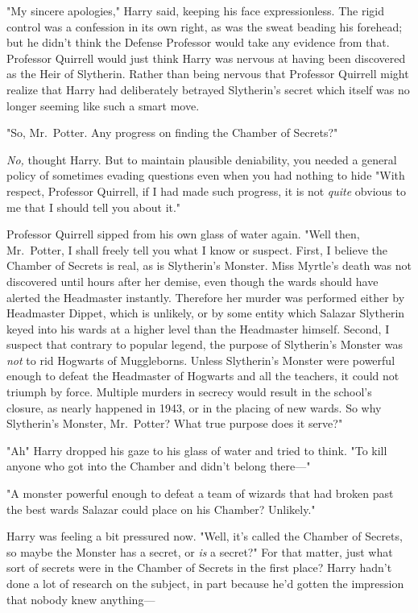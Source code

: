 "My sincere apologies," Harry said, keeping his face expressionless. The rigid
control was a confession in its own right, as was the sweat beading his
forehead; but he didn't think the Defense Professor would take any evidence
from that. Professor Quirrell would just think Harry was nervous at having been
discovered as the Heir of Slytherin. Rather than being nervous that Professor
Quirrell might realize that Harry had deliberately betrayed Slytherin's
secret{\el} which itself was no longer seeming like such a smart move.

"So, Mr.~Potter. Any progress on finding the Chamber of Secrets?"

\emph{No,} thought Harry. But to maintain plausible deniability, you needed a
general policy of sometimes evading questions even when you had nothing to
hide{\el} "With respect, Professor Quirrell, if I had made such progress, it
is not \emph{quite} obvious to me that I should tell you about it."

Professor Quirrell sipped from his own glass of water again. "Well then,
Mr.~Potter, I shall freely tell you what I know or suspect. First, I believe
the Chamber of Secrets is real, as is Slytherin's Monster. Miss Myrtle's death
was not discovered until hours after her demise, even though the wards should
have alerted the Headmaster instantly. Therefore her murder was performed
either by Headmaster Dippet, which is unlikely, or by some entity which Salazar
Slytherin keyed into his wards at a higher level than the Headmaster himself.
Second, I suspect that contrary to popular legend, the purpose of Slytherin's
Monster was \emph{not} to rid Hogwarts of Muggleborns. Unless Slytherin's
Monster were powerful enough to defeat the Headmaster of Hogwarts and all the
teachers, it could not triumph by force. Multiple murders in secrecy would
result in the school's closure, as nearly happened in 1943, or in the placing
of new wards. So why Slytherin's Monster, Mr.~Potter? What true purpose does it
serve?"

"Ah{\el}" Harry dropped his gaze to his glass of water and tried to think. "To
kill anyone who got into the Chamber and didn't belong there—"

"A monster powerful enough to defeat a team of wizards that had broken past the
best wards Salazar could place on his Chamber? Unlikely."

Harry was feeling a bit pressured now. "Well, it's called the Chamber of
Secrets, so maybe the Monster has a secret, or \emph{is} a secret?" For that
matter, just what sort of secrets were in the Chamber of Secrets in the first
place? Harry hadn't done a lot of research on the subject, in part because he'd
gotten the impression that nobody knew anything—

